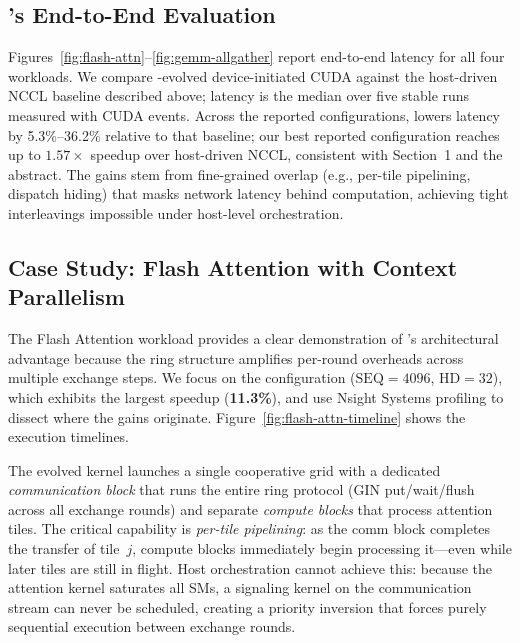 \vspace{-3pt}
\subsection{\cufuse{}'s End-to-End Evaluation}
\vspace{-3pt}
\label{sec:e2e}

Figures~\ref{fig:flash-attn}--\ref{fig:gemm-allgather} report end-to-end latency for all four workloads. We compare \cufuse{}-evolved device-initiated CUDA against the host-driven NCCL baseline described above; latency is the median over five stable runs measured with CUDA events. Across the reported configurations, \cufuse{} lowers latency by 5.3\%--36.2\% relative to that baseline; our best reported configuration reaches up to $1.57\times$ speedup over host-driven NCCL, consistent with Section~1 and the abstract. The gains stem from fine-grained overlap (e.g., per-tile pipelining, dispatch hiding) that masks network latency behind computation, achieving tight interleavings impossible under host-level orchestration.

\vspace{-3pt}
\subsection{Case Study: Flash Attention with Context Parallelism}
\vspace{-3pt}
\label{sec:flash-attn-deep-dive}

The Flash Attention workload provides a clear demonstration of \cufuse{}'s architectural advantage because the ring structure amplifies per-round overheads across multiple exchange steps. We focus on the configuration ($\text{SEQ}=4096$, $\text{HD}=32$), which exhibits the largest speedup (\textbf{11.3\%}), and use Nsight Systems profiling to dissect where the gains originate. Figure~\ref{fig:flash-attn-timeline} shows the execution timelines.

The \cufuse{} evolved kernel launches a single cooperative grid with a dedicated \emph{communication block} that runs the entire ring protocol (GIN put/wait/flush across all exchange rounds) and separate \emph{compute blocks} that process attention tiles. The critical capability is \emph{per-tile pipelining}: as the comm block completes the transfer of tile~$j$, compute blocks immediately begin processing it---even while later tiles are still in flight. Host orchestration cannot achieve this: because the attention kernel saturates all SMs, a signaling kernel on the communication stream can never be scheduled, creating a priority inversion that forces purely sequential execution between exchange rounds.


